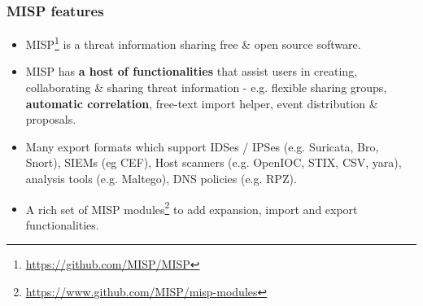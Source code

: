 
\begin{frame}
 \frametitle{MISP features}
 \begin{itemize}
         \item MISP\footnote{\url{https://github.com/MISP/MISP}} is a threat information sharing free \& open source software.
         \item MISP has {\bf a host of functionalities} that assist users in creating, collaborating \& sharing threat information - e.g. flexible sharing groups, {\bf automatic correlation}, free-text import helper, event distribution \& proposals.
         \item Many export formats which support IDSes / IPSes (e.g. Suricata, Bro, Snort), SIEMs (eg CEF), Host scanners (e.g. OpenIOC, STIX, CSV, yara), analysis tools (e.g. Maltego), DNS policies (e.g. RPZ).
         \item A rich set of MISP modules\footnote{\url{https://www.github.com/MISP/misp-modules}} to add expansion, import and export functionalities.
 \end{itemize}
\end{frame}

